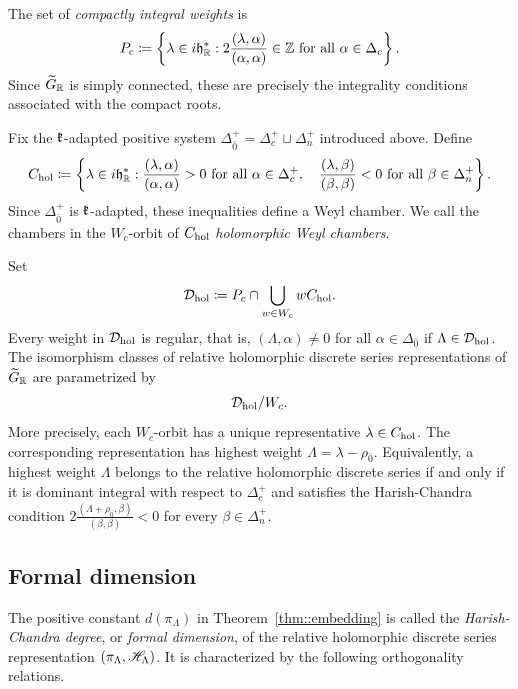 The set of \emph{compactly integral weights} is
\begin{equation}
P_{c}
\coloneqq
\left\{
\lambda\in i{\mathfrak h}_{{\mathbb R}}^{\ast}:
2\frac{(\lambda,\alpha)}{(\alpha,\alpha)}\in{\mathbb Z}
\text{ for all }\alpha\in\Delta_{c}
\right\}.
\end{equation}
Since $\widetilde{G}_{{\mathbb R}}$ is simply connected, these are precisely the integrality conditions associated with the compact roots.

Fix the ${\mathfrak k}$-adapted positive system
$
\Delta_{\bar0}^{+}=\Delta_{c}^{+}\sqcup\Delta_{n}^{+}
$
introduced above. Define
\begin{equation}
C_{\operatorname{hol}}
\coloneqq
\left\{
\lambda\in i{\mathfrak h}_{{\mathbb R}}^{\ast}:
\frac{(\lambda,\alpha)}{(\alpha,\alpha)}>0
\text{ for all }\alpha\in\Delta_{c}^{+},
\quad
\frac{(\lambda,\beta)}{(\beta,\beta)}<0
\text{ for all }\beta\in\Delta_{n}^{+}
\right\}.
\end{equation}
Since $\Delta_{\bar0}^{+}$ is ${\mathfrak k}$-adapted, these inequalities define a Weyl chamber. We call the chambers in the $W_{c}$-orbit of $C_{\operatorname{hol}}$ \emph{holomorphic Weyl chambers}.

Set
\begin{equation}
\mathcal{D}_{\operatorname{hol}}
\coloneqq
P_{c}\cap\bigcup_{w\in W_{c}}wC_{\operatorname{hol}}.
\end{equation}
Every weight in $\mathcal{D}_{\operatorname{hol}}$ is regular, that is, $(\Lambda,\alpha)\neq 0$ for all $\alpha \in \Delta_{\bar{0}}$ if $\Lambda \in \mathcal{D}_{\operatorname{hol}}$. The isomorphism classes of relative holomorphic discrete series representations of $\widetilde{G}_{{\mathbb R}}$ are parametrized by
\begin{equation}
\mathcal{D}_{\operatorname{hol}}/W_{c}.
\end{equation}
More precisely, each $W_{c}$-orbit has a unique representative $\lambda\in C_{\operatorname{hol}}$. The corresponding representation has highest weight
$
\Lambda=\lambda-\rho_{\bar0}.
$
Equivalently, a highest weight $\Lambda$ belongs to the relative holomorphic discrete series if and only if it is dominant integral with respect to $\Delta_{c}^{+}$ and satisfies the Harish-Chandra condition
$
2\frac{(\Lambda+\rho_{\bar0},\beta)}{(\beta,\beta)}<0
$
for every $\beta\in\Delta_{n}^{+}$.

\subsection{Formal dimension}
\label{subsec::formal_dimension}

The positive constant $d(\pi_{\Lambda})$ in Theorem~\ref{thm::embedding} is called the \emph{Harish-Chandra degree}, or \emph{formal dimension}, of the relative holomorphic discrete series representation $(\pi_{\Lambda},{\mathscr{H}}_{\Lambda})$. It is characterized by the following orthogonality relations.

